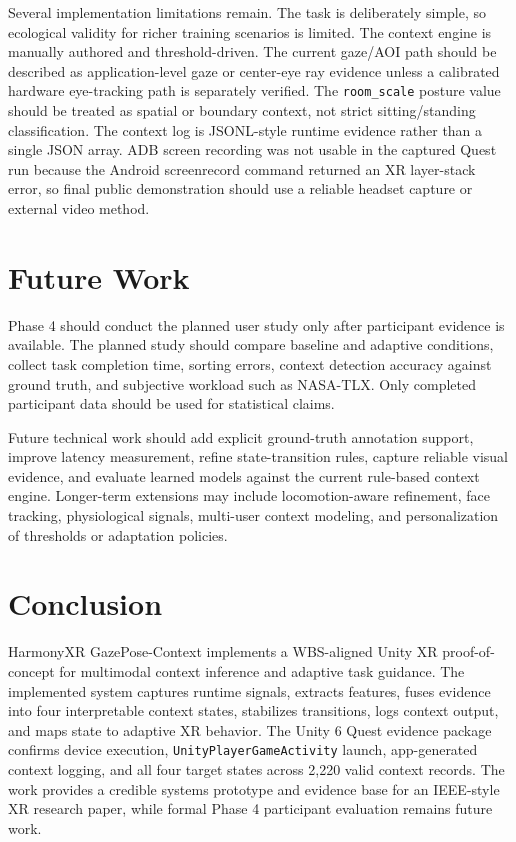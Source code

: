 \documentclass[conference]{IEEEtran}
\begin{document}
Several implementation limitations remain. The task is deliberately simple, so ecological validity for richer training scenarios is limited. The context engine is manually authored and threshold-driven. The current gaze/AOI path should be described as application-level gaze or center-eye ray evidence unless a calibrated hardware eye-tracking path is separately verified. The \texttt{room\_scale} posture value should be treated as spatial or boundary context, not strict sitting/standing classification. The context log is JSONL-style runtime evidence rather than a single JSON array. ADB screen recording was not usable in the captured Quest run because the Android screenrecord command returned an XR layer-stack error, so final public demonstration should use a reliable headset capture or external video method.

\section{Future Work}
Phase 4 should conduct the planned user study only after participant evidence is available. The planned study should compare baseline and adaptive conditions, collect task completion time, sorting errors, context detection accuracy against ground truth, and subjective workload such as NASA-TLX. Only completed participant data should be used for statistical claims.

Future technical work should add explicit ground-truth annotation support, improve latency measurement, refine state-transition rules, capture reliable visual evidence, and evaluate learned models against the current rule-based context engine. Longer-term extensions may include locomotion-aware refinement, face tracking, physiological signals, multi-user context modeling, and personalization of thresholds or adaptation policies.

\section{Conclusion}
HarmonyXR GazePose-Context implements a WBS-aligned Unity XR proof-of-concept for multimodal context inference and adaptive task guidance. The implemented system captures runtime signals, extracts features, fuses evidence into four interpretable context states, stabilizes transitions, logs context output, and maps state to adaptive XR behavior. The Unity 6 Quest evidence package confirms device execution, \texttt{UnityPlayerGameActivity} launch, app-generated context logging, and all four target states across 2,220 valid context records. The work provides a credible systems prototype and evidence base for an IEEE-style XR research paper, while formal Phase 4 participant evaluation remains future work.
\end{document}

